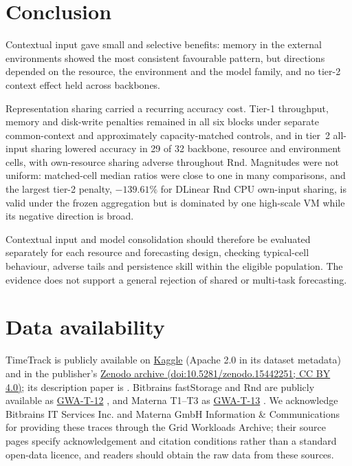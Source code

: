 \section{Conclusion}
\label{sec:conclusion}

Contextual input gave small and selective benefits: memory in the external
environments showed the most consistent favourable pattern, but directions
depended on the resource, the environment and the model family, and no
tier-2 context effect held across backbones.

Representation sharing carried a recurring accuracy cost. Tier-1 throughput,
memory and disk-write penalties remained in all six blocks under separate
common-context and approximately capacity-matched controls, and in tier~2
all-input sharing lowered accuracy in 29 of 32 backbone, resource and
environment cells, with own-resource sharing adverse throughout Rnd.
Magnitudes were not uniform: matched-cell median ratios were close to one in
many comparisons, and the largest tier-2 penalty, $-139.61\%$ for DLinear Rnd
CPU own-input sharing, is valid under the frozen aggregation but is dominated
by one high-scale VM while its negative direction is broad.

Contextual input and model consolidation should therefore be evaluated
separately for each resource and forecasting design, checking typical-cell
behaviour, adverse tails and persistence skill within the eligible
population. The evidence does not support a general rejection of shared or
multi-task forecasting.

\section*{Data availability}

TimeTrack is publicly available on
\href{https://www.kaggle.com/datasets/abdelghanimeliani/open-air-interface-cicd-timeseries-dataset}{Kaggle}
(Apache 2.0 in its dataset metadata) and in the publisher's
\href{https://doi.org/10.5281/zenodo.15442251}{Zenodo archive
(doi:10.5281/zenodo.15442251; CC BY 4.0)}; its description paper is
\citet{Meliani2025TimeTrack}. Bitbrains fastStorage and Rnd are publicly
available as \href{https://atlarge-research.com/gwa-t-12/}{GWA-T-12}
\citep{Shen2015Bitbrains}, and Materna T1--T3 as
\href{https://atlarge-research.com/gwa-t-13/}{GWA-T-13}
\citep{Kohne2014FederatedCloudSim,Kohne2016SLAScheduling}. We acknowledge
Bitbrains IT Services Inc. and Materna GmbH Information \& Communications for
providing these traces through the Grid Workloads Archive; their source pages
specify acknowledgement and citation conditions rather than a standard
open-data licence, and readers should obtain the raw data from these sources.

